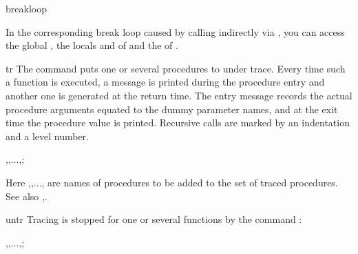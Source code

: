 \begin{Concept}{breakloop}
In the corresponding break loop caused by calling  
indirectly via , you can access the global , the
locals  and  of  and the  of 
.
\end{Concept}


\begin{Operator}{tr}
The command  puts one or several procedures to
under trace. Every time such a function is executed, a message
is printed during the procedure entry and another one is generated
at the return time. The entry message records the 
actual procedure arguments equated to the dummy parameter
names, and at the exit time the procedure value is printed.
Recursive calls are marked by an indentation and a level number.

\begin{Syntax}
   ,,...,;
\end{Syntax}
Here  ,,..., 
are names of procedures
to be added to the set of traced procedures. See also
,.
\end{Operator}

\begin{Operator}{untr}
Tracing is stopped for one or several functions by the
command :
\begin{Syntax}
   ,,...,;
\end{Syntax}
\end{Operator}


